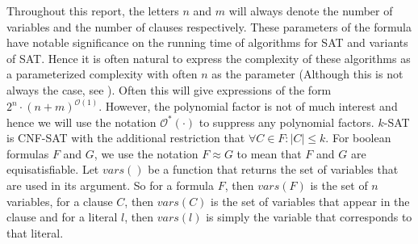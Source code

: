 Throughout this report, the letters $n$ and $m$ will always denote the
number of variables and the number of clauses respectively. These
parameters of the formula have notable significance on the running time
of algorithms for SAT and variants of SAT. Hence it is often natural
to express the complexity of these algorithms as a parameterized complexity
with often $n$ as the parameter (Although this is not always the case, see \cite{hirsch2000new}).
Often this will give expressions of the
form $2^n \cdot (n + m)^{\mathcal{O}(1)}$. However, the polynomial
factor is not of much interest and hence we will use the notation
$\mathcal{O}^{\ast}(\cdot)$ to suppress any polynomial factors.
$k$-SAT is CNF-SAT with the additional restriction that $\forall C \in F : |C| \leq k$.
For boolean formulas $F$ and $G$, we use the notation $F \approx G$ to mean
that $F$ and $G$ are equisatisfiable.
Let $vars()$ be a function that returns the set of variables that are used
in its argument. So for a formula $F$, then $vars(F)$ is the set of $n$ variables,
for a clause $C$, then $vars(C)$ is the set of variables that appear in the clause
and for a literal $l$, then $vars(l)$ is simply the variable that corresponds to
that literal.